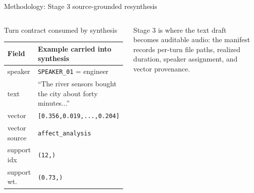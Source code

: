 \documentclass[aspectratio=169,10pt]{beamer}
\begin{document}
\begin{frame}{Methodology: Stage 3 source-grounded resynthesis}
\begin{columns}[T,totalwidth=\textwidth]
\begin{block}{Turn contract consumed by synthesis}
{\fontsize{6.1}{6.75}\selectfont
\begin{tabularx}{\linewidth}{p{1.65cm}Y}
\toprule
Field & Example carried into synthesis \\
\midrule
speaker & \texttt{SPEAKER\_01} = engineer \\
text & ``The river sensors bought the city about forty minutes...'' \\
vector & \texttt{[0.356,0.019,...,0.204]} \\
vector source & \texttt{affect\_analysis} \\
support idx & \texttt{(12,)} \\
support wt. & \texttt{(0.73,)} \\
\bottomrule
\end{tabularx}
}
\end{block}
\vspace{0.1em}
{\fontsize{6.1}{6.8}\selectfont Stage 3 is where the text draft becomes auditable audio: the manifest records per-turn file paths, realized duration, speaker assignment, and vector provenance.}
\end{columns}
\end{frame}
\end{document}
